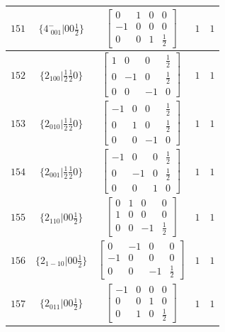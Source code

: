 \documentclass[fleqn,8pt]{jsarticle}
\begin{document}
\begin{longtable}{ccccc}
$ 151 $ & $ \{4^{-}_{\,\,001}|0 0 \frac{1}{2}\} $ & $ \begin{bmatrix} 0 & 1 & 0 & 0 \\ -1 & 0 & 0 & 0 \\ 0 & 0 & 1 & \frac{1}{2} \end{bmatrix} $ & $ 1 $ & $ 1 $ \\ \hline
$ 152 $ & $ \{2{}_{100}|\frac{1}{2} \frac{1}{2} 0\} $ & $ \begin{bmatrix} 1 & 0 & 0 & \frac{1}{2} \\ 0 & -1 & 0 & \frac{1}{2} \\ 0 & 0 & -1 & 0 \end{bmatrix} $ & $ 1 $ & $ 1 $ \\ \hline
$ 153 $ & $ \{2{}_{010}|\frac{1}{2} \frac{1}{2} 0\} $ & $ \begin{bmatrix} -1 & 0 & 0 & \frac{1}{2} \\ 0 & 1 & 0 & \frac{1}{2} \\ 0 & 0 & -1 & 0 \end{bmatrix} $ & $ 1 $ & $ 1 $ \\ \hline
$ 154 $ & $ \{2{}_{001}|\frac{1}{2} \frac{1}{2} 0\} $ & $ \begin{bmatrix} -1 & 0 & 0 & \frac{1}{2} \\ 0 & -1 & 0 & \frac{1}{2} \\ 0 & 0 & 1 & 0 \end{bmatrix} $ & $ 1 $ & $ 1 $ \\ \hline
$ 155 $ & $ \{2{}_{110}|0 0 \frac{1}{2}\} $ & $ \begin{bmatrix} 0 & 1 & 0 & 0 \\ 1 & 0 & 0 & 0 \\ 0 & 0 & -1 & \frac{1}{2} \end{bmatrix} $ & $ 1 $ & $ 1 $ \\ \hline
$ 156 $ & $ \{2{}_{1-10}|0 0 \frac{1}{2}\} $ & $ \begin{bmatrix} 0 & -1 & 0 & 0 \\ -1 & 0 & 0 & 0 \\ 0 & 0 & -1 & \frac{1}{2} \end{bmatrix} $ & $ 1 $ & $ 1 $ \\ \hline
$ 157 $ & $ \{2{}_{011}|0 0 \frac{1}{2}\} $ & $ \begin{bmatrix} -1 & 0 & 0 & 0 \\ 0 & 0 & 1 & 0 \\ 0 & 1 & 0 & \frac{1}{2} \end{bmatrix} $ & $ 1 $ & $ 1 $ \\ \hline

\end{longtable}
\end{document}
